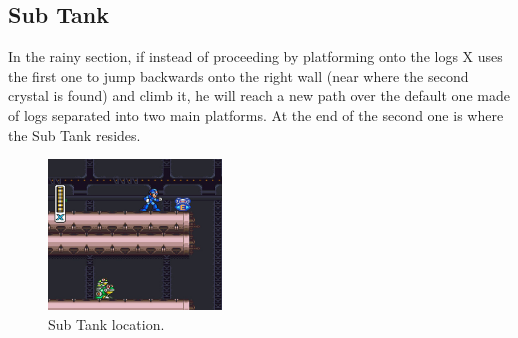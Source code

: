 \subsection{Sub Tank}
In the rainy section, if instead of proceeding by platforming onto the logs X uses the first one to jump backwards onto the right wall (near where the second crystal is found) and climb it, he will reach a new path over the default one made of logs separated into two main platforms. At the end of the second one is where the Sub Tank resides.  
\begin{figure}[htp]
	\centering
	\includegraphics[height=4cm]{figures/X2/Wire_sponge/Sponge_tank.jpg}
	\caption{Sub Tank location.}
\end{figure}


